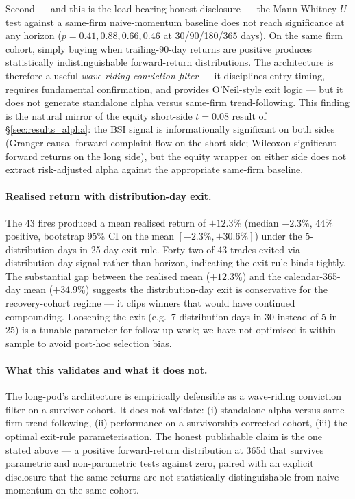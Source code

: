 \documentclass[11pt,a4paper]{article}
\begin{document}
Second --- and this is the load-bearing honest disclosure --- the Mann-Whitney $U$ test against a same-firm naive-momentum baseline does not reach significance at any horizon ($p = 0.41, 0.88, 0.66, 0.46$ at 30/90/180/365 days). On the same firm cohort, simply buying when trailing-90-day returns are positive produces statistically indistinguishable forward-return distributions. The architecture is therefore a useful \emph{wave-riding conviction filter} --- it disciplines entry timing, requires fundamental confirmation, and provides O'Neil-style exit logic --- but it does not generate standalone alpha versus same-firm trend-following. This finding is the natural mirror of the equity short-side $t = 0.08$ result of §\ref{sec:results_alpha}: the BSI signal is informationally significant on both sides (Granger-causal forward complaint flow on the short side; Wilcoxon-significant forward returns on the long side), but the equity wrapper on either side does not extract risk-adjusted alpha against the appropriate same-firm baseline.

\paragraph{Realised return with distribution-day exit.} The 43 fires produced a mean realised return of $+12.3\%$ (median $-2.3\%$, 44\% positive, bootstrap 95\% CI on the mean $[-2.3\%, +30.6\%]$) under the 5-distribution-days-in-25-day exit rule. Forty-two of 43 trades exited via distribution-day signal rather than horizon, indicating the exit rule binds tightly. The substantial gap between the realised mean ($+12.3\%$) and the calendar-365-day mean ($+34.9\%$) suggests the distribution-day exit is conservative for the recovery-cohort regime --- it clips winners that would have continued compounding. Loosening the exit (e.g.\ 7-distribution-days-in-30 instead of 5-in-25) is a tunable parameter for follow-up work; we have not optimised it within-sample to avoid post-hoc selection bias.

\paragraph{What this validates and what it does not.} The long-pod's architecture is empirically defensible as a wave-riding conviction filter on a survivor cohort. It does not validate: (i) standalone alpha versus same-firm trend-following, (ii) performance on a survivorship-corrected cohort, (iii) the optimal exit-rule parameterisation. The honest publishable claim is the one stated above --- a positive forward-return distribution at 365d that survives parametric and non-parametric tests against zero, paired with an explicit disclosure that the same returns are not statistically distinguishable from naive momentum on the same cohort.
\end{document}
